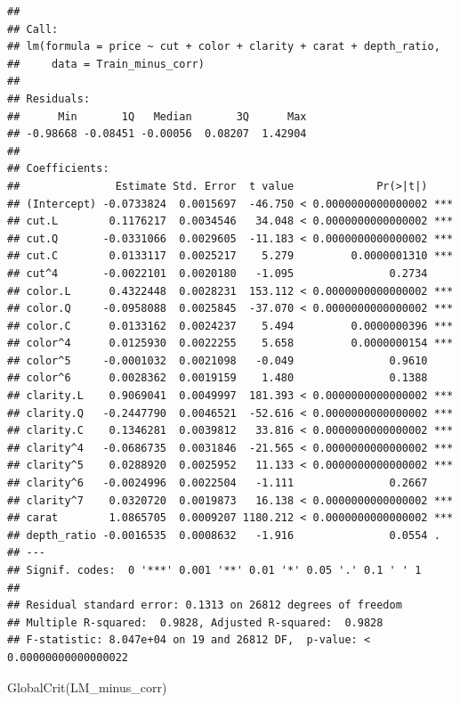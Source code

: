 \documentclass[
]{article}
\newenvironment{Shaded}{\begin{snugshade}}{\end{snugshade}}
\newcommand{\FunctionTok}[1]{\textcolor[rgb]{0.00,0.00,0.00}{#1}}
\newcommand{\NormalTok}[1]{#1}
\begin{document}
\begin{verbatim}
##
## Call:
## lm(formula = price ~ cut + color + clarity + carat + depth_ratio,
##     data = Train_minus_corr)
##
## Residuals:
##      Min       1Q   Median       3Q      Max
## -0.98668 -0.08451 -0.00056  0.08207  1.42904
##
## Coefficients:
##               Estimate Std. Error  t value             Pr(>|t|)
## (Intercept) -0.0733824  0.0015697  -46.750 < 0.0000000000000002 ***
## cut.L        0.1176217  0.0034546   34.048 < 0.0000000000000002 ***
## cut.Q       -0.0331066  0.0029605  -11.183 < 0.0000000000000002 ***
## cut.C        0.0133117  0.0025217    5.279         0.0000001310 ***
## cut^4       -0.0022101  0.0020180   -1.095               0.2734
## color.L      0.4322448  0.0028231  153.112 < 0.0000000000000002 ***
## color.Q     -0.0958088  0.0025845  -37.070 < 0.0000000000000002 ***
## color.C      0.0133162  0.0024237    5.494         0.0000000396 ***
## color^4      0.0125930  0.0022255    5.658         0.0000000154 ***
## color^5     -0.0001032  0.0021098   -0.049               0.9610
## color^6      0.0028362  0.0019159    1.480               0.1388
## clarity.L    0.9069041  0.0049997  181.393 < 0.0000000000000002 ***
## clarity.Q   -0.2447790  0.0046521  -52.616 < 0.0000000000000002 ***
## clarity.C    0.1346281  0.0039812   33.816 < 0.0000000000000002 ***
## clarity^4   -0.0686735  0.0031846  -21.565 < 0.0000000000000002 ***
## clarity^5    0.0288920  0.0025952   11.133 < 0.0000000000000002 ***
## clarity^6   -0.0024996  0.0022504   -1.111               0.2667
## clarity^7    0.0320720  0.0019873   16.138 < 0.0000000000000002 ***
## carat        1.0865705  0.0009207 1180.212 < 0.0000000000000002 ***
## depth_ratio -0.0016535  0.0008632   -1.916               0.0554 .
## ---
## Signif. codes:  0 '***' 0.001 '**' 0.01 '*' 0.05 '.' 0.1 ' ' 1
##
## Residual standard error: 0.1313 on 26812 degrees of freedom
## Multiple R-squared:  0.9828, Adjusted R-squared:  0.9828
## F-statistic: 8.047e+04 on 19 and 26812 DF,  p-value: < 0.00000000000000022
\end{verbatim}

\begin{Shaded}
\begin{Highlighting}[]
\FunctionTok{GlobalCrit}\NormalTok{(LM\_minus\_corr)}
\end{Highlighting}
\end{Shaded}
\end{document}
